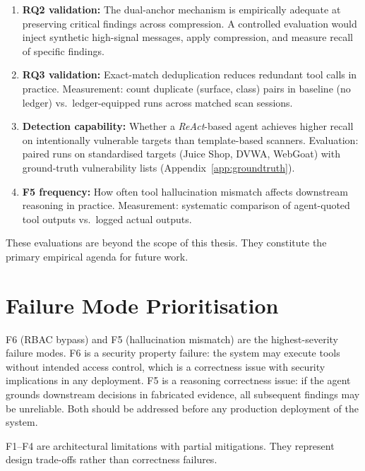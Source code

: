 \documentclass[12pt, a4paper, oneside, openany]{book}
\begin{document}
\begin{enumerate}[leftmargin=*]
  \item \textbf{RQ2 validation:} The dual-anchor mechanism is
    empirically adequate at preserving critical findings across
    compression.  A controlled evaluation would inject synthetic
    high-signal messages, apply compression, and measure recall
    of specific findings.

  \item \textbf{RQ3 validation:} Exact-match deduplication reduces
    redundant tool calls in practice.  Measurement: count duplicate
    (surface, class) pairs in baseline (no ledger) vs.\ ledger-equipped
    runs across matched scan sessions.

  \item \textbf{Detection capability:} Whether a \textit{ReAct}-based
    agent achieves higher recall on intentionally vulnerable targets
    than template-based scanners.  Evaluation: paired runs on
    standardised targets (Juice Shop, DVWA, WebGoat) with ground-truth
    vulnerability lists (Appendix~\ref{app:groundtruth}).

  \item \textbf{F5 frequency:} How often tool hallucination mismatch
    affects downstream reasoning in practice.  Measurement: systematic
    comparison of agent-quoted tool outputs vs.\ logged actual outputs.
\end{enumerate}

These evaluations are beyond the scope of this thesis.  They constitute
the primary empirical agenda for future work.

\section{Failure Mode Prioritisation}

F6 (RBAC bypass) and F5 (hallucination mismatch) are the highest-severity
failure modes.  F6 is a security property failure: the system may
execute tools without intended access control, which is a correctness
issue with security implications in any deployment.  F5 is a reasoning
correctness issue: if the agent grounds downstream decisions in
fabricated evidence, all subsequent findings may be unreliable.
Both should be addressed before any production deployment of the system.

F1--F4 are architectural limitations with partial mitigations.  They
represent design trade-offs rather than correctness failures.
\end{document}

